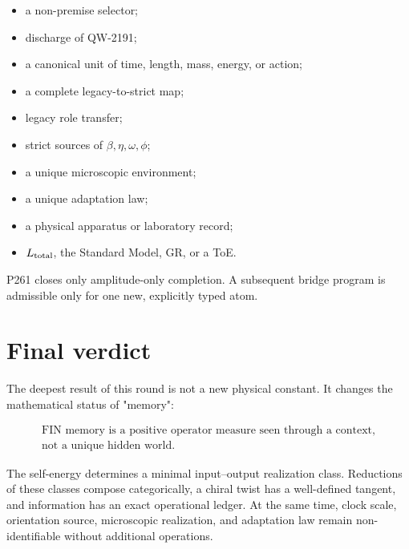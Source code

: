 \documentclass[11pt,a4paper,openany]{report}
\begin{document}
\begin{itemize}
\item 
a non-premise selector;

\item 
discharge of QW-2191;

\item 
a canonical unit of time, length, mass, energy, or action;

\item 
a complete legacy-to-strict map;

\item 
legacy role transfer;

\item 
strict sources of \(\beta,\eta,\omega,\phi\);

\item 
a unique microscopic environment;

\item 
a unique adaptation law;

\item 
a physical apparatus or laboratory record;

\item 
\(L_{\rm total}\), the Standard Model, GR, or a ToE.

\end{itemize}

P261 closes only amplitude-only completion. A subsequent bridge program is admissible only for one new, explicitly typed atom.

\chapter{Final verdict}

The deepest result of this round is not a new physical constant. It changes the mathematical status of "memory":

\[
\boxed{
\begin{gathered}
\text{FIN memory is a positive operator measure seen through a context,}\\
\text{not a unique hidden world.}
\end{gathered}
}
\]

The self-energy determines a minimal input--output realization class. Reductions of these classes compose categorically, a chiral twist has a well-defined tangent, and information has an exact operational ledger. At the same time, clock scale, orientation source, microscopic realization, and adaptation law remain non-identifiable without additional operations.
\end{document}
